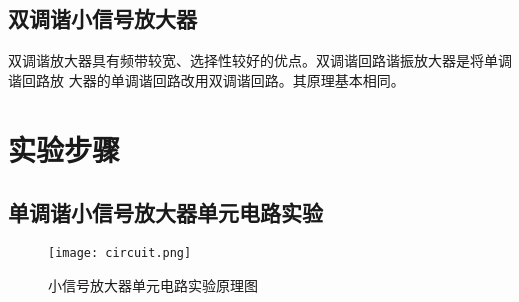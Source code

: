 \documentclass[../main]{subfiles}
\begin{document}
\subsection{双调谐小信号放大器}%
\label{sub:双调谐小信号放大器}

双调谐放大器具有频带较宽、选择性较好的优点。双调谐回路谐振放大器是将单调谐回路放
大器的单调谐回路改用双调谐回路。其原理基本相同。

\section{实验步骤}%
\label{sec:\arabic{chapter}实验步骤}

\subsection{单调谐小信号放大器单元电路实验}%
\label{sub:单调谐小信号放大器单元电路实验}

\begin{figure}[htbp]
	\centering
	\texttt{[image: circuit.png]}
	\caption{小信号放大器单元电路实验原理图}
	\label{fig:小信号放大器单元电路实验原理图}
\end{figure}
\end{document}
